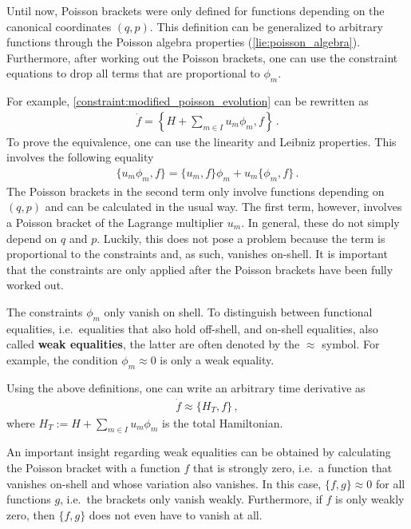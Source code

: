     \begin{method}
        Until now, Poisson brackets were only defined for functions depending on the canonical coordinates $(q,p)$. This definition can be generalized to arbitrary functions through the Poisson algebra properties (\cref{lie:poisson_algebra}). Furthermore, after working out the Poisson brackets, one can use the constraint equations to drop all terms that are proportional to $\phi_m$.

        For example, \cref{constraint:modified_poisson_evolution} can be rewritten as
        \begin{gather}
            \dot{f} = \left\{H + \sum_{m\in I}u_m\phi_m,f\right\}\,.
        \end{gather}
        To prove the equivalence, one can use the linearity and Leibniz properties. This involves the following equality
        \begin{gather}
            \{u_m\phi_m, f\} = \{u_m,f\}\phi_m + u_m\{\phi_m,f\}\,.
        \end{gather}
        The Poisson brackets in the second term only involve functions depending on $(q,p)$ and can be calculated in the usual way. The first term, however, involves a Poisson bracket of the Lagrange multiplier $u_m$. In general, these do not simply depend on $q$ and $p$. Luckily, this does not pose a problem because the term is proportional to the constraints and, as such, vanishes on-shell. It is important that the constraints are only applied after the Poisson brackets have been fully worked out.
    \end{method}

    \begin{notation}
        The constraints $\phi_m$ only vanish on shell. To distinguish between functional equalities, i.e.~equalities that also hold off-shell, and on-shell equalities, also called \textbf{weak equalities}, the latter are often denoted by the $\approx$ symbol. For example, the condition $\phi_m\approx0$ is only a weak equality.
    \end{notation}
    Using the above definitions, one can write an arbitrary time derivative as
    \begin{gather}
        \dot{f}\approx\{H_T,f\}\,,
    \end{gather}
    where $H_T := H + \sum_{m\in I}u_m\phi_m$ is the total Hamiltonian.

    \begin{remark}[Closure]
        An important insight regarding weak equalities can be obtained by calculating the Poisson bracket with a function $f$ that is strongly zero, i.e.~a function that vanishes on-shell and whose variation also vanishes. In this case, $\{f,g\}\approx0$ for all functions $g$, i.e.~the brackets only vanish weakly. Furthermore, if $f$ is only weakly zero, then $\{f,g\}$ does not even have to vanish at all.
    \end{remark}

